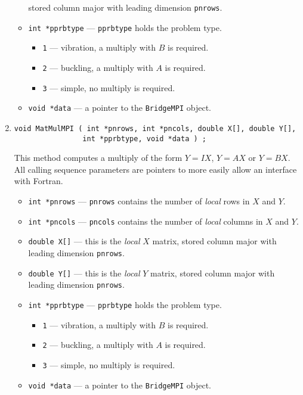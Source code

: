 \begin{enumerate}
\begin{itemize}
      stored column major with leading dimension {\tt *pnrows}.
\item {\tt int *pprbtype} --- {\tt *pprbtype} holds the problem type.
   \begin{itemize}
   \item {\tt 1} --- vibration, a multiply with $B$ is required.
   \item {\tt 2} --- buckling, a multiply with $A$ is required.
   \item {\tt 3} --- simple, no multiply is required.
   \end{itemize}
\item {\tt void *data} --- a pointer to the {\tt BridgeMPI} object.
\end{itemize}
\item
\begin{verbatim}
void MatMulMPI ( int *pnrows, int *pncols, double X[], double Y[],
                int *pprbtype, void *data ) ;
\end{verbatim}
This method computes a multiply of the form $Y = I X$, $Y = A X$
or $Y = B X$.
All calling sequence parameters are pointers to more
easily allow an interface with Fortran.
\begin{itemize}
\item {\tt int *pnrows} --- {\tt *pnrows} contains the number of
      {\it local} rows in $X$ and $Y$.
\item {\tt int *pncols} --- {\tt *pncols} contains the number of
      {\it local} columns in $X$ and $Y$.
\item {\tt double X[]} --- this is the {\it local} $X$ matrix, 
      stored column major with leading dimension {\tt *pnrows}.
\item {\tt double Y[]} --- this is the {\it local} $Y$ matrix, 
      stored column major with leading dimension {\tt *pnrows}.
\item {\tt int *pprbtype} --- {\tt *pprbtype} holds the problem type.
   \begin{itemize}
   \item {\tt 1} --- vibration, a multiply with $B$ is required.
   \item {\tt 2} --- buckling, a multiply with $A$ is required.
   \item {\tt 3} --- simple, no multiply is required.
   \end{itemize}
\item {\tt void *data} --- a pointer to the {\tt BridgeMPI} object.

\end{itemize}
\end{enumerate}
